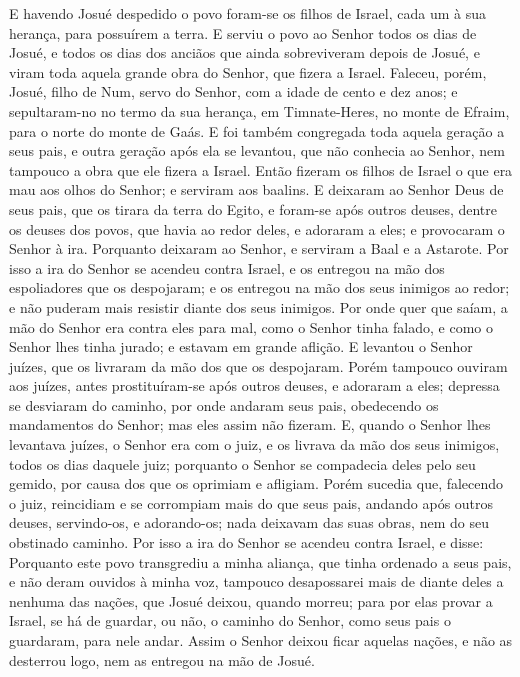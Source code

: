 E havendo Josué despedido o povo foram-se os filhos de Israel,
cada um à sua herança, para possuírem a terra. E serviu o povo
ao Senhor todos os dias de Josué, e todos os dias dos anciãos que
ainda sobreviveram depois de Josué, e viram toda aquela grande obra
do Senhor, que fizera a Israel. Faleceu, porém, Josué, filho de
Num, servo do Senhor, com a idade de cento e dez anos; e
sepultaram-no no termo da sua herança, em Timnate-Heres, no monte de
Efraim, para o norte do monte de Gaás. E foi também
congregada toda aquela geração a seus pais, e outra geração após ela
se levantou, que não conhecia ao Senhor, nem tampouco a obra que ele
fizera a Israel. Então fizeram os filhos de Israel o que era
mau aos olhos do Senhor; e serviram aos baalins. E deixaram
ao Senhor Deus de seus pais, que os tirara da terra do Egito, e
foram-se após outros deuses, dentre os deuses dos povos, que havia
ao redor deles, e adoraram a eles; e provocaram o Senhor à ira.
Porquanto deixaram ao Senhor, e serviram a Baal e a Astarote.
Por isso a ira do Senhor se acendeu contra Israel, e os
entregou na mão dos espoliadores que os despojaram; e os entregou na
mão dos seus inimigos ao redor; e não puderam mais resistir diante
dos seus inimigos. Por onde quer que saíam, a mão do Senhor
era contra eles para mal, como o Senhor tinha falado, e como o
Senhor lhes tinha jurado; e estavam em grande aflição. E
levantou o Senhor juízes, que os livraram da mão dos que os
despojaram. Porém tampouco ouviram aos juízes, antes
prostituíram-se após outros deuses, e adoraram a eles; depressa se
desviaram do caminho, por onde andaram seus pais, obedecendo os
mandamentos do Senhor; mas eles assim não fizeram. E, quando
o Senhor lhes levantava juízes, o Senhor era com o juiz, e os
livrava da mão dos seus inimigos, todos os dias daquele juiz;
porquanto o Senhor se compadecia deles pelo seu gemido, por causa
dos que os oprimiam e afligiam. Porém sucedia que, falecendo
o juiz, reincidiam e se corrompiam mais do que seus pais, andando
após outros deuses, servindo-os, e adorando-os; nada deixavam das
suas obras, nem do seu obstinado caminho. Por isso a ira do
Senhor se acendeu contra Israel, e disse: Porquanto este povo
transgrediu a minha aliança, que tinha ordenado a seus pais, e não
deram ouvidos à minha voz, tampouco desapossarei mais de
diante deles a nenhuma das nações, que Josué deixou, quando morreu;
para por elas provar a Israel, se há de guardar, ou não, o
caminho do Senhor, como seus pais o guardaram, para nele andar.
Assim o Senhor deixou ficar aquelas nações, e não as
desterrou logo, nem as entregou na mão de Josué.

